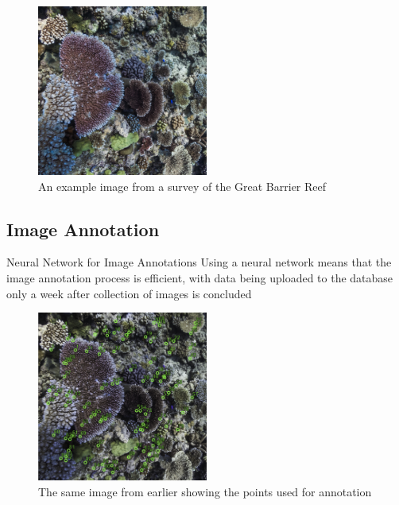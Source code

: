 \documentclass{beamer}
\begin{document}
            \begin{frame}
                \begin{figure}
                    \centering
                    \includegraphics[width = 0.5\textwidth]{coral.jpg}
                    \caption{An example image from a survey of the Great Barrier Reef}
                \end{figure}
            \end{frame}

          \subsection{Image Annotation}
              \begin{frame}{Neural Network for Image Annotations}
                  Using a neural network means that the image annotation process is efficient, with data being uploaded to the database only a week after collection of images is concluded
              \end{frame}

              \begin{frame}
                  \begin{figure}
                      \centering
                      \includegraphics[width = 0.5\textwidth]{coral_points.jpg}
                      \caption{The same image from earlier showing the points used for annotation}
                  \end{figure}
              \end{frame}
\end{document}
